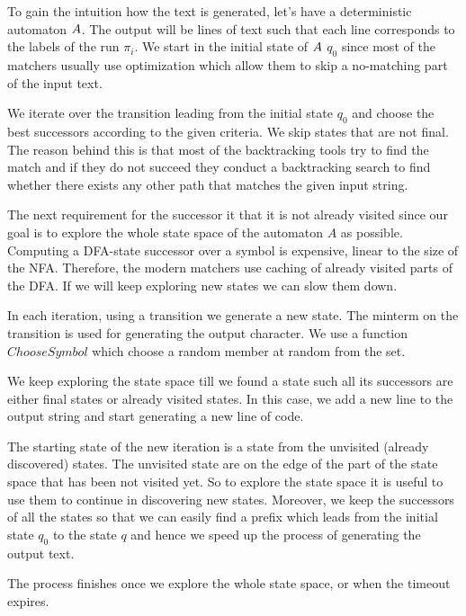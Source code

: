 \documentclass[acmsmall,screen]{acmart}
\begin{document}
To gain the intuition how the text is generated, let's have a deterministic automaton $A$. 
%
The output will be lines of text such that each line corresponds to the labels of the run $\pi_i$.
%
We start in the initial state of $A$ $q_0$ since most of the matchers usually use optimization which allow them to skip a no-matching part of the input text.
%

We iterate over the transition leading from the initial state $q_0$ and choose the best successors according to the given criteria. 
%
We skip states that are not final. 
%
The reason behind this is that most of the backtracking tools try to find the match and if they do not succeed 
%
they conduct a backtracking search to find whether there exists any other path that matches the given input string.
%

%
The next requirement for the successor it that it is not already visited since our goal is 
%
to explore the whole state space of the automaton $A$ as possible.
%
Computing a DFA-state successor over a symbol is expensive, linear to the size of the NFA.
%
Therefore, the modern matchers use caching of already visited parts of the DFA. 
%
If we will keep exploring new states we can slow them down.

%
In each iteration, using a transition we generate a new state.
%
The minterm on the transition is used for generating the output character. 
%
We use a function $ChooseSymbol$ which choose a random member at random from the set.
%

We keep exploring the state space till we found a state such all its successors are either final states or already visited states.
%
In this case, we add a new line to the output string and start generating a new line of code.
%

The starting state of the new iteration is a state from the unvisited (already discovered) states. 
%
The unvisited state are on the edge of the part of the state space that has been not visited yet. 
%
So to explore the state space it is useful to use them to continue in discovering new states.
%
Moreover, we keep the successors of all the states so that we can easily find a prefix
%
which leads from the initial state $q_0$ to the state $q$ 
%
and hence we speed up the process of generating the output text.

The process finishes once we explore the whole state space, or when the timeout expires.
  



\end{document}
